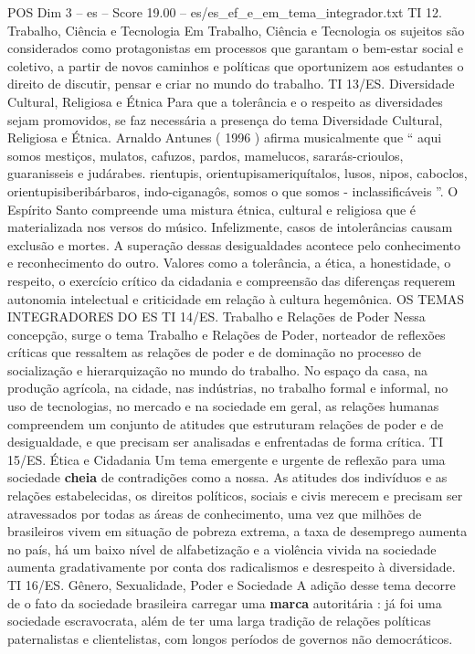 \begin{textsample}{POS Dim 3 – es – Score 19.00 – es/es\_ef\_e\_em\_tema\_integrador.txt}
TI 12.
Trabalho, Ciência e Tecnologia Em Trabalho, Ciência e Tecnologia os sujeitos são considerados como protagonistas em processos que garantam o bem-estar social e coletivo, a partir de novos caminhos e políticas que oportunizem aos estudantes o direito de discutir, pensar e criar no mundo do trabalho.
TI 13/ES.
Diversidade Cultural, Religiosa e Étnica Para que a tolerância e o respeito as diversidades sejam promovidos, se faz necessária a presença do tema Diversidade Cultural, Religiosa e Étnica.
Arnaldo Antunes ( 1996 ) afirma musicalmente que “ aqui somos mestiços, mulatos, cafuzos, pardos, mamelucos, sararás-crioulos, guaranisseis e judárabes. rientupis, orientupisameriquítalos, lusos, nipos, caboclos, orientupisiberibárbaros, indo-ciganagôs, somos o que somos - inclassificáveis ”.
O Espírito Santo compreende uma mistura étnica, cultural e religiosa que é materializada nos versos do músico.
Infelizmente, casos de intolerâncias causam exclusão e mortes.
A superação dessas desigualdades acontece pelo conhecimento e reconhecimento do outro.
Valores como a tolerância, a ética, a honestidade, o respeito, o exercício crítico da cidadania e compreensão das diferenças requerem autonomia intelectual e criticidade em relação à cultura hegemônica.
OS TEMAS INTEGRADORES DO ES TI 14/ES.
Trabalho e Relações de Poder Nessa concepção, surge o tema Trabalho e Relações de Poder, norteador de reflexões críticas que ressaltem as relações de poder e de dominação no processo de socialização e hierarquização no mundo do trabalho.
No espaço da casa, na produção agrícola, na cidade, nas indústrias, no trabalho formal e informal, no uso de tecnologias, no mercado e na sociedade em geral, as relações humanas compreendem um conjunto de atitudes que estruturam relações de poder e de desigualdade, e que precisam ser analisadas e enfrentadas de forma crítica.
TI 15/ES.
Ética e Cidadania Um tema emergente e urgente de reflexão para uma sociedade \textbf{cheia} de contradições como a nossa.
As atitudes dos indivíduos e as relações estabelecidas, os direitos políticos, sociais e civis merecem e precisam ser atravessados por todas as áreas de conhecimento, uma vez que milhões de brasileiros vivem em situação de pobreza extrema, a taxa de desemprego aumenta no país, há um baixo nível de alfabetização e a violência vivida na sociedade aumenta gradativamente por conta dos radicalismos e desrespeito à diversidade.
TI 16/ES.
Gênero, Sexualidade, Poder e Sociedade A adição desse tema decorre de o fato da sociedade brasileira carregar uma \textbf{marca} autoritária : já foi uma sociedade escravocrata, além de ter uma larga tradição de relações políticas paternalistas e clientelistas, com longos períodos de governos não democráticos.

\end{textsample}
